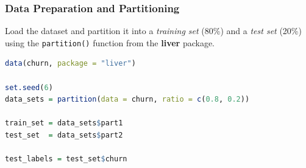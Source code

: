 \documentclass[
]{book}
\newcommand{\passthrough}[1]{#1}
\theoremstyle{definition}
\theoremstyle{definition}
\theoremstyle{definition}
\theoremstyle{definition}
\theoremstyle{remark}
\begin{document}
\subsubsection{Data Preparation and Partitioning}\label{data-preparation-and-partitioning}

Load the dataset and partition it into a \emph{training set} (80\%) and a \emph{test set} (20\%) using the \passthrough{\lstinline!partition()!} function from the \textbf{liver} package.

\begin{lstlisting}[language=R]
data(churn, package = "liver")

set.seed(6)
data_sets = partition(data = churn, ratio = c(0.8, 0.2))

train_set = data_sets$part1
test_set  = data_sets$part2

test_labels = test_set$churn
\end{lstlisting}
\end{document}
